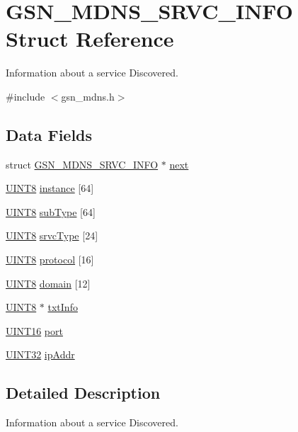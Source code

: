 \hypertarget{a00146}{
\section{GSN\_\-MDNS\_\-SRVC\_\-INFO Struct Reference}
\label{a00146}
}


Information about a service Discovered.  




{\ttfamily \#include $<$gsn\_\-mdns.h$>$}

\subsection*{Data Fields}
\begin{DoxyCompactItemize}
\item 
struct \hyperlink{a00146}{GSN\_\-MDNS\_\-SRVC\_\-INFO} $\ast$ \hyperlink{a00146_a01c0050e80bbd90dcd988cf8e31d7568}{next}
\item 
\hyperlink{a00660_gab27e9918b538ce9d8ca692479b375b6a}{UINT8} \hyperlink{a00146_a5c759bb432f78e05c87ab0fbe8f1a4d7}{instance} \mbox{[}64\mbox{]}
\item 
\hyperlink{a00660_gab27e9918b538ce9d8ca692479b375b6a}{UINT8} \hyperlink{a00146_a80101829ddb694c333de0c4bbcc202d2}{subType} \mbox{[}64\mbox{]}
\item 
\hyperlink{a00660_gab27e9918b538ce9d8ca692479b375b6a}{UINT8} \hyperlink{a00146_a7865388e48a7e1f116b62c4eebfc369a}{srvcType} \mbox{[}24\mbox{]}
\item 
\hyperlink{a00660_gab27e9918b538ce9d8ca692479b375b6a}{UINT8} \hyperlink{a00146_af6597a37273ce39652a0624ee5d2cd72}{protocol} \mbox{[}16\mbox{]}
\item 
\hyperlink{a00660_gab27e9918b538ce9d8ca692479b375b6a}{UINT8} \hyperlink{a00146_a30bc41a1ecdf6122e9ec7ef33f3e0a0d}{domain} \mbox{[}12\mbox{]}
\item 
\hyperlink{a00660_gab27e9918b538ce9d8ca692479b375b6a}{UINT8} $\ast$ \hyperlink{a00146_a1d40c0fd52db9aaeaa3cd93b6561506c}{txtInfo}
\item 
\hyperlink{a00660_ga09f1a1fb2293e33483cc8d44aefb1eb1}{UINT16} \hyperlink{a00146_a126a61701dc53e71d74b8e1b50c01ce3}{port}
\item 
\hyperlink{a00660_gae1e6edbbc26d6fbc71a90190d0266018}{UINT32} \hyperlink{a00146_a48e99cad0feadbd616a0cda7d9628826}{ipAddr}
\end{DoxyCompactItemize}


\subsection{Detailed Description}
Information about a service Discovered. 

